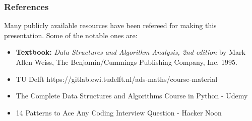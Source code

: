 \begin{frame}\frametitle{References}
Many publicly available resources have been refereed for making this presentation. Some of the notable ones are:
\footnotesize
\begin{itemize}
\item {\bf Textbook: }
{\em Data Structures and Algorithm Analysis, 2nd edition} by Mark Allen Weiss,
The Benjamin/Cummings Publishing Company, Inc.
1995. 
\item TU Delft https://gitlab.ewi.tudelft.nl/ads-maths/course-material 
\item The Complete Data Structures and Algorithms Course in Python - Udemy
\item 14 Patterns to Ace Any Coding Interview Question - Hacker Noon
\end{itemize}
\end{frame}
